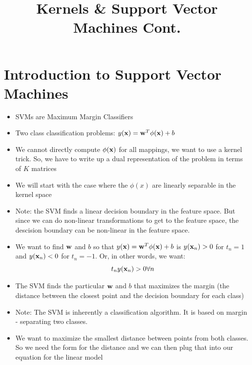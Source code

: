\documentclass[12pt,letterpaper]{article}
\title{Kernels \& Support Vector Machines Cont. }
\begin{document}
\maketitle

\section{Introduction to Support Vector Machines}
\begin{itemize}
\item SVMs are Maximum Margin Classifiers 
\item Two class classification problems: $y(\mathbf{x}) = \mathbf{w}^T\phi(\mathbf{x}) + b$

\item We cannot directly compute $\phi(\mathbf{x})$ for all mappings, we want to use a kernel trick.  So, we have to write up a dual representation of the problem in terms of $K$ matrices
\item We will start with the case where the $\phi(x)$ are linearly separable in the kernel space
\item Note: the SVM finds a linear decision boundary in the feature space.  But since we can do non-linear transformations to get to the feature space, the descision boundary can be non-linear in the feature space. 
\item We want to find $\mathbf{w}$ and $b$ so that $y(\mathbf{x}) = \mathbf{w}^T\phi(\mathbf{x}) + b$ is $y(\mathbf{x}_n) > 0$ for $t_n = 1$ and $y(\mathbf{x}_n) < 0$ for $t_n = -1$.  Or, in other words, we want:
\begin{equation}
t_ny(\mathbf{x}_n) > 0 \forall n
\end{equation}
\item The SVM finds the particular $\mathbf{w}$ and $b$ that maximizes the margin (the distance between the closest point and the decision boundary for each class)
\item Note: The SVM is inherently a classification algorithm.  It is based on margin - separating two classes. 
\item We want to maximize the smallest distance between points from both classes.  So we need the form for the distance and we can then plug that into our equation for the linear model


\end{itemize}
\end{document}
